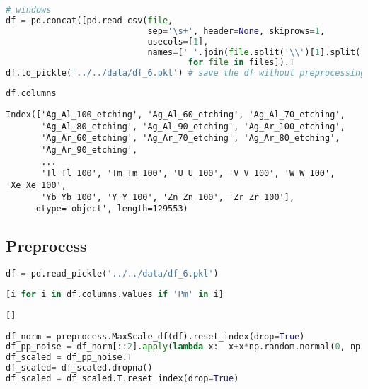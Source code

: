 \begin{lstlisting}[language=Python]
# windows
df = pd.concat([pd.read_csv(file,
                            sep='\s+', header=None, skiprows=1,
                            usecols=[1],
                            names=['_'.join(file.split('\\')[1].split('_')[:-1])]).T 
                                    for file in files]).T
df.to_pickle('../../data/df_6.pkl') # save the df without preprocessing
\end{lstlisting}

\begin{lstlisting}[language=Python]
df.columns
\end{lstlisting}

\begin{lstlisting}
Index(['Ag_Al_100_etching', 'Ag_Al_60_etching', 'Ag_Al_70_etching',
       'Ag_Al_80_etching', 'Ag_Al_90_etching', 'Ag_Ar_100_etching',
       'Ag_Ar_60_etching', 'Ag_Ar_70_etching', 'Ag_Ar_80_etching',
       'Ag_Ar_90_etching',
       ...
       'Tl_Tl_100', 'Tm_Tm_100', 'U_U_100', 'V_V_100', 'W_W_100', 'Xe_Xe_100',
       'Yb_Yb_100', 'Y_Y_100', 'Zn_Zn_100', 'Zr_Zr_100'],
      dtype='object', length=129553)
\end{lstlisting}

\hypertarget{preprocess}{%
\subsection{Preprocess}\label{preprocess}}

\begin{lstlisting}[language=Python]
df = pd.read_pickle('../../data/df_6.pkl') 
\end{lstlisting}

\begin{lstlisting}[language=Python]
[i for i in df.columns.values if 'Pm' in i]
\end{lstlisting}

\begin{lstlisting}
[]
\end{lstlisting}

\begin{lstlisting}[language=Python]
df_norm = preprocess.MaxScale_df(df).reset_index(drop=True)                                                    # each spectrum is scaled to 1
df_pp_noise = df_norm[::2].apply(lambda x:  x+x*np.random.normal(0, np.random.randint(1,3)*0.01 , len(x)))     # reduce size to 1024 and add noise
df_scaled = df_pp_noise.T
df_scaled= df_scaled.dropna()
df_scaled = df_scaled.T.reset_index(drop=True)
\end{lstlisting}

